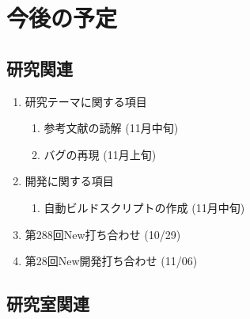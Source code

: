 \documentclass[fleqn, 14pt]{extarticle}
\begin{document}
    \section{今後の予定}
    \label{sec-4}

    \subsection{研究関連}
    \label{sec-4-1}

    \begin{enumerate}

        \item 研究テーマに関する項目
            \hfill
            \begin{enumerate}

                \item 参考文献の読解
                    \hfill
                    (11月中旬)

                \item バグの再現
                    \hfill
                    (11月上旬)

            \end{enumerate}

        \item 開発に関する項目
            \hfill
            \begin{enumerate}

                \item 自動ビルドスクリプトの作成
                    \hfill
                    (11月中旬)

            \end{enumerate}

        \item 第288回New打ち合わせ
            \hfill
            \label{enum-7}
            (10/29)

        \item 第28回New開発打ち合わせ
            \hfill
            \label{enum-7}
            (11/06)

    \end{enumerate}

    \subsection{研究室関連}
    \label{sec-4-2}
\end{document}
